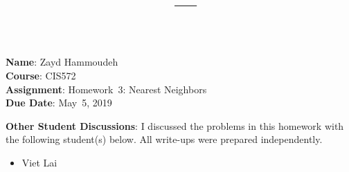 \documentclass{report}
\title{\textbf{\course\ --- \assnName}}
\author{\name}
\newcommand{\name}{Zayd Hammoudeh}
\newcommand{\course}{CIS572}
\newcommand{\assnName}{Homework~3: Nearest Neighbors}
\newcommand{\dueDate}{May~5, 2019}
\begin{document}
  \maketitle

  \noindent
  \textbf{Name}: \name\\
  \textbf{Course}: \course\\
  \textbf{Assignment}: \assnName\\
  \textbf{Due Date}: \dueDate%

  \noindent
  \textbf{Other Student Discussions}: I discussed the problems in this homework with the following student(s) below.  All write-ups were prepared independently.
  \vspace{-1em}
  \begin{itemize}
    \item Viet Lai
  \end{itemize}

  \newpage
  
  
  
  
  
\end{document}
